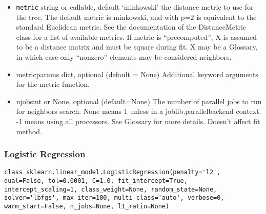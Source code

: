\documentclass[12pt]{article}
\begin{document}
\begin{itemize}
\item \texttt{metric} string or callable, default ‘minkowski’
the distance metric to use for the tree. The default metric is minkowski, and with p=2 is equivalent to the standard Euclidean metric. See the documentation of the DistanceMetric class for a list of available metrics. If metric is “precomputed”, X is assumed to be a distance matrix and must be square during fit. X may be a Glossary, in which case only “nonzero” elements may be considered neighbors.

\item
metric\textunderscore params dict, optional (default = None)
Additional keyword arguments for the metric function.

\item
n\textunderscore jobsint or None, optional (default=None)
The number of parallel jobs to run for neighbors search. None means 1 unless in a joblib.parallel\textunderscore backend context. -1 means using all processors. See Glossary for more details. Doesn’t affect fit method.
\end{itemize}

\newpage
\subsubsection{Logistic Regression}
\begin{lstlisting}
class sklearn.linear_model.LogisticRegression(penalty='l2', dual=False, tol=0.0001, C=1.0, fit_intercept=True, intercept_scaling=1, class_weight=None, random_state=None, solver='lbfgs', max_iter=100, multi_class='auto', verbose=0, warm_start=False, n_jobs=None, l1_ratio=None)
\end{lstlisting}
\end{document}
